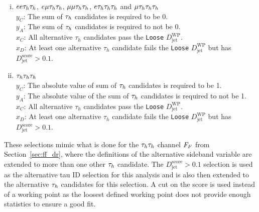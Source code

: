 \begin{enumerate}[i)]
   \item $ee\tau_{h}\tau_{h}$, $e\mu\tau_{h}\tau_{h}$, $\mu\mu\tau_{h}\tau_{h}$, $e\tau_{h}\tau_{h}\tau_{h}$ and $\mu\tau_{h}\tau_{h}\tau_{h}$  \\
     \indent $y_C$: The sum of $\tau_{h}$ candidates is required to be 0. \\
     \indent $y_A$: The sum of $\tau_{h}$ candidates is required to not be 0. \\
     \indent $x_C$: All alternative $\tau_h$ candidates pass the \texttt{Loose} $D_{\text{jet}}^{\text{WP}}$. \\
     \indent $x_D$: At least one alternative $\tau_h$ candidate fails the \texttt{Loose} $D_{\text{jet}}^{\text{WP}}$ but has $D_{\text{jet}}^{\text{score}} > 0.1$.
  \item $\tau_{h}\tau_{h}\tau_{h}$ \\
     \indent $y_C$: The absolute value of sum of $\tau_{h}$ candidates is required to be 1. \\
     \indent $y_A$: The absolute value of the sum of $\tau_{h}$ candidates is required to not be 1. \\
     \indent $x_C$: All alternative $\tau_h$ candidates pass the \texttt{Loose} $D_{\text{jet}}^{\text{WP}}$. \\
     \indent $x_D$: At least one alternative $\tau_h$ candidate fails the \texttt{Loose} $D_{\text{jet}}^{\text{WP}}$ but has $D_{\text{jet}}^{\text{score}} > 0.1$.
\end{enumerate}

These selections mimic what is done for the $\tau_{h}\tau_{h}$ channel $F_{F}$ from Section~\ref{sec:ff_dr}, where the definitions of the alternative sideband variable are extended to more than one other $\tau_{h}$ candidate.
The $D_{\text{jet}}^{\text{score}} > 0.1$ selection is used as the alternative tau ID selection for this analysis and is also then extended to the alternative $\tau_{h}$ candidates for this selection.
A cut on the score is used instead of a working point as the loosest defined working point does not provide enough statistics to ensure a good fit. \\

